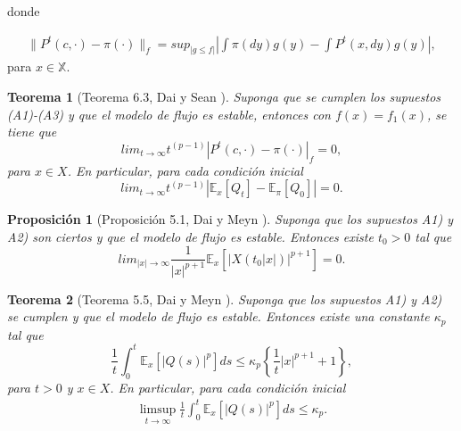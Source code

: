 \documentclass{article}
\newtheorem{Teo}{Teorema}
\newtheorem{Prop}{Proposición}
\newcommand{\esp}{\mathbb{E}}
\begin{document}
donde

\begin{eqnarray*}
\parallel
P^{t}\left(c,\cdot\right)-\pi\left(\cdot\right)\parallel_{f}=sup_{|g\leq
f|}|\int\pi\left(dy\right)g\left(y\right)-\int
P^{t}\left(x,dy\right)g\left(y\right)|,
\end{eqnarray*}
para $x\in\mathbb{X}$.

\begin{Teo}[Teorema 6.3, Dai y Sean \cite{DaiSean}]\label{Tma.6.3}
Suponga que se cumplen los supuestos (A1)-(A3) y que el modelo de
flujo es estable, entonces con
$f\left(x\right)=f_{1}\left(x\right)$, se tiene que
\[lim_{t\rightarrow\infty}t^{(p-1)}\left|P^{t}\left(c,\cdot\right)-\pi\left(\cdot\right)\right|_{f}=0,\]
para $x\in X$. En particular, para cada condici\'on inicial
\[lim_{t\rightarrow\infty}t^{(p-1)}\left|\esp_{x}\left[Q_{t}\right]-\esp_{\pi}\left[Q_{0}\right]\right|=0.\]
\end{Teo}



\begin{Prop}[Proposici\'on 5.1, Dai y Meyn \cite{DaiSean}]\label{Prop.5.1.DaiSean}
Suponga que los supuestos A1) y A2) son ciertos y que el modelo de
flujo es estable. Entonces existe $t_{0}>0$ tal que
\begin{equation}
lim_{|x|\rightarrow\infty}\frac{1}{|x|^{p+1}}\esp_{x}\left[|X\left(t_{0}|x|\right)|^{p+1}\right]=0.
\end{equation}
\end{Prop}


\begin{Teo}[Teorema 5.5, Dai y Meyn \cite{DaiSean}]\label{Tma.5.5.DaiSean}
Suponga que los supuestos A1) y A2) se cumplen y que el modelo de
flujo es estable. Entonces existe una constante $\kappa_{p}$ tal
que
\begin{equation}
\frac{1}{t}\int_{0}^{t}\esp_{x}\left[|Q\left(s\right)|^{p}\right]ds\leq\kappa_{p}\left\{\frac{1}{t}|x|^{p+1}+1\right\},
\end{equation}
para $t>0$ y $x\in X$. En particular, para cada condici\'on
inicial
\begin{eqnarray*}
\limsup_{t\rightarrow\infty}\frac{1}{t}\int_{0}^{t}\esp_{x}\left[|Q\left(s\right)|^{p}\right]ds\leq\kappa_{p}.
\end{eqnarray*}
\end{Teo}
\end{document}
